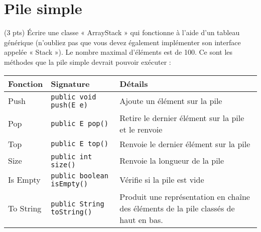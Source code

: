 \documentclass[10pt]{report}
\begin{document}
    \chapter{Pile simple}
    \begin{Exercice}{(3 pts)}{}
      Écrire une classe « ArrayStack » qui fonctionne à l'aide d'un tableau 
      générique (n’oubliez pas que vous
      devez également implémenter son interface appelée « Stack »). 
      Le nombre maximal d’éléments est de
      100. Ce sont les méthodes que la pile simple devrait 
      pouvoir exécuter :
    \end{Exercice}


  \begin{table}[H]

    \begin{center}
      \renewcommand{\arraystretch}{1.5}
      \selectfont
      \footnotesize
          \begin{tabular}{p{2cm} p{4cm} p{4cm}}
          \arrayrulecolor{blue}\hline
          \rowcolor{draculawhite-background}
          \textcolor{myb}{Fonction} & 
          \textcolor{myb}{Signature} & 
          \textcolor{myb}{Détails}  
          \\
          \hline
          \arrayrulecolor{black}
          Push   & 
          \texttt{public void push(E e)}  
                 &
          Ajoute un élément sur la pile 
          \\
          \hline
          Pop   &  
          \texttt{public E pop()}  
                &
          Retire le dernier élément sur la pile et le renvoie
          \\
          \hline
          Top  &
          \texttt{public E top()} 
               &
          Renvoie le dernier élément sur la pile
          \\ 
          \hline
          Size & 
          \texttt{public int size()}  
               &
          Renvoie la longueur de la pile
          \\
          \hline 
          Is Empty & 
          \texttt{public boolean isEmpty()}  
                   &
          Vérifie si la pile est vide
          \\
          \hline 
          To String & 
          \texttt{public String toString()}  
                    &
          Produit une représentation en chaîne des éléments 
          de la pile classés de haut en bas. 
          \\ 
          \hline
          \end{tabular}
  \end{center}
  \end{table}
  \vspace{-1em}
\end{document}
